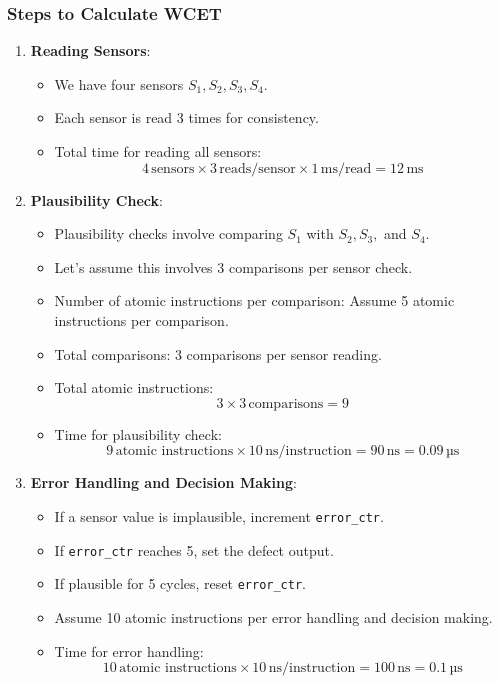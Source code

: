 \documentclass[12pt	]{article}
\begin{document}
\subsubsection{Steps to Calculate WCET}
\begin{enumerate}
	\item \textbf{Reading Sensors}:
	\begin{itemize}
		\item We have four sensors \( S_1, S_2, S_3, S_4 \).
		\item Each sensor is read 3 times for consistency.
		\item Total time for reading all sensors:
		\[
		4 \, \text{sensors} \times 3 \, \text{reads/sensor} \times 1 \, \text{ms/read} = 12 \, \text{ms}
		\]
	\end{itemize}
	
	
	\item \textbf{Plausibility Check}:
	\begin{itemize}
		\item Plausibility checks involve comparing \( S_1 \) with \( S_2, S_3, \) and \( S_4 \).
		\item Let's assume this involves 3 comparisons per sensor check.
		\item Number of atomic instructions per comparison: Assume 5 atomic instructions per comparison.
		\item Total comparisons: 3 comparisons per sensor reading.
		\item Total atomic instructions:
		\[
		3 \times 3 \, \text{comparisons} = 9
		\]
		\item Time for plausibility check:
		\[
		9 \, \text{atomic instructions} \times 10 \, \text{ns/instruction} = 90 \, \text{ns} = 0.09 \, \text{µs}
		\]
	\end{itemize}
	
	
	\item \textbf{Error Handling and Decision Making}:
	\begin{itemize}
		\item If a sensor value is implausible, increment \texttt{error\_ctr}.
		\item If \texttt{error\_ctr} reaches 5, set the defect output.
		\item If plausible for 5 cycles, reset \texttt{error\_ctr}.
		\item Assume 10 atomic instructions per error handling and decision making.
		\item Time for error handling:
		\[
		10 \, \text{atomic instructions} \times 10 \, \text{ns/instruction} = 100 \, \text{ns} = 0.1 \, \text{µs}
		\]
	\end{itemize}
	

\end{enumerate}
\end{document}
